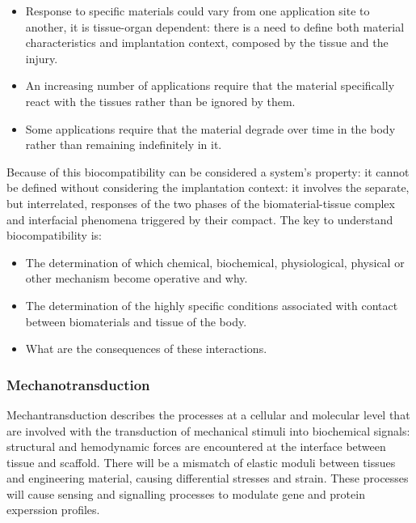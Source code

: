 	\begin{multicols}{2}
		\begin{itemize}
			\item Response to specific materials could vary from one application site to another, it is tissue-organ dependent: there is a need to define both material characteristics and implantation context, composed by the tissue and the injury.
			\item An increasing number of applications require that the material specifically react with the tissues rather than be ignored by them.
			\item Some applications require that the material degrade over time in the body rather than remaining indefinitely in it.
		\end{itemize}
	\end{multicols}

	Because of this biocompatibility can be considered a system's property: it cannot be defined without considering the implantation context: it involves the separate, but interrelated, responses of the two phases of the biomaterial-tissue complex and interfacial phenomena triggered by their compact.
	The key to understand biocompatibility is:

	\begin{multicols}{2}
		\begin{itemize}
			\item The determination of which chemical, biochemical, physiological, physical or other mechanism become operative and why.
			\item The determination of the highly specific conditions associated with contact between biomaterials and tissue of the body.
			\item What are the consequences of these interactions.
		\end{itemize}
	\end{multicols}

		\subsubsection{Mechanotransduction}
		Mechantransduction describes the processes at a cellular and molecular level that are involved with the transduction of mechanical stimuli into biochemical signals: structural and hemodynamic forces are encountered at the interface between tissue and scaffold.
		There will be a mismatch of elastic moduli between tissues and engineering material, causing differential stresses and strain.
		These processes will cause sensing and signalling processes to modulate gene and protein experssion profiles.

